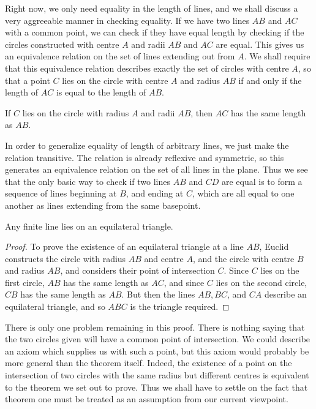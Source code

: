 Right now, we only need equality in the length of lines, and we shall discuss a very aggreeable manner in checking equality. If we have two lines $AB$ and $AC$ with a common point, we can check if they have equal length by checking if the circles constructed with centre $A$ and radii $AB$ and $AC$ are equal. This gives us an equivalence relation on the set of lines extending out from $A$. We shall require that this equivalence relation describes exactly the set of circles with centre $A$, so that a point $C$ lies on the circle with centre $A$ and radius $AB$ if and only if the length of $AC$ is equal to the length of $AB$.

\begin{axiom}
    If $C$ lies on the circle with radius $A$ and radii $AB$, then $AC$ has the same length as $AB$.
\end{axiom}

In order to generalize equality of length of arbitrary lines, we just make the relation transitive. The relation is already reflexive and symmetric, so this generates an equivalence relation on the set of all lines in the plane. Thus we see that the only basic way to check if two lines $AB$ and $CD$ are equal is to form a sequence of lines beginning at $B$, and ending at $C$, which are all equal to one another as lines extending from the same basepoint.

\begin{theorem}
    Any finite line lies on an equilateral triangle.
\end{theorem}
\begin{proof}
    To prove the existence of an equilateral triangle at a line $AB$, Euclid constructs the circle with radius $AB$ and centre $A$, and the circle with centre $B$ and radius $AB$, and considers their point of intersection $C$. Since $C$ lies on the first circle, $AB$ has the same length as $AC$, and since $C$ lies on the second circle, $CB$ has the same length as $AB$. But then the lines $AB, BC$, and $CA$ describe an equilateral triangle, and so $ABC$ is the triangle required.
\end{proof}

There is only one problem remaining in this proof. There is nothing saying that the two circles given will have a common point of intersection. We could describe an axiom which supplies us with such a point, but this axiom would probably be more general than the theorem itself. Indeed, the existence of a point on the intersection of two circles with the same radius but different centres is equivalent to the theorem we set out to prove. Thus we shall have to settle on the fact that theorem one must be treated as an assumption from our current viewpoint.

